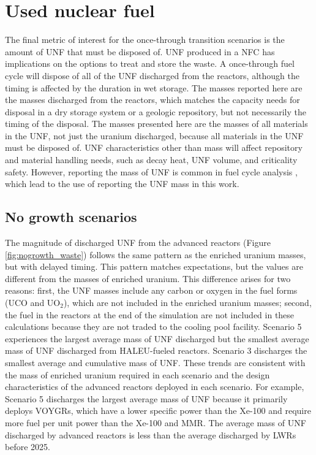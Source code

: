 \section{Used nuclear fuel}
The final metric of interest for the once-through transition scenarios is 
the amount of \gls{UNF} that must be disposed of.
\gls{UNF} produced in a \gls{NFC} has implications on the options 
to treat and store the waste. A once-through fuel cycle will dispose of 
all of the \gls{UNF} discharged from the reactors, although 
the timing is affected by the duration in wet storage. The masses 
reported here are the masses discharged from the reactors, which 
matches the capacity needs for disposal in a dry storage system or a 
geologic repository, but not necessarily the timing of the disposal.
The masses 
presented here are the masses of all materials in the \gls{UNF}, not just 
the uranium discharged, because all materials in the \gls{UNF} must be 
disposed of. \gls{UNF} characteristics other than mass will affect repository 
and material handling needs, such as decay heat, \gls{UNF} volume, and 
criticality safety. However, reporting the mass of \gls{UNF} is common in 
fuel cycle analysis \cite{sunny_transition_2015,feng_standardized_2016,bae_standardized_2019},
which lead to the use of reporting the \gls{UNF} mass in this work. 

\subsection{No growth scenarios}
The magnitude of discharged \gls{UNF} from the advanced reactors 
(Figure \ref{fig:nogrowth_waste}) follows the same pattern as the enriched 
uranium masses, but with delayed timing. This pattern matches expectations, 
but the values are different from the masses of enriched uranium. 
This difference arises for two reasons: first, the 
\gls{UNF} masses include any carbon or oxygen in the fuel forms (UCO and 
UO$_2$), which 
are not included in the enriched uranium masses; second, the 
fuel in the reactors at the end of the simulation are not included in these 
calculations because they are not traded to the cooling pool facility.
Scenario 5 experiences the largest average mass of \gls{UNF} 
discharged but the smallest average mass of \gls{UNF} discharged from 
\gls{HALEU}-fueled reactors. 
Scenario 3 discharges the smallest average and cumulative mass of \gls{UNF}.
These trends are consistent with the mass of enriched uranium required 
in each scenario and the design characteristics of the advanced 
reactors deployed in each scenario. For example, Scenario 5 discharges the 
largest average mass of \gls{UNF} because it primarily deploys VOYGRs, which 
have a lower specific power than the Xe-100 and require more fuel per unit 
power than the Xe-100 and \gls{MMR}. 
The average mass of \gls{UNF} discharged by advanced reactors is less than 
the average discharged by \glspl{LWR} before 2025. 

